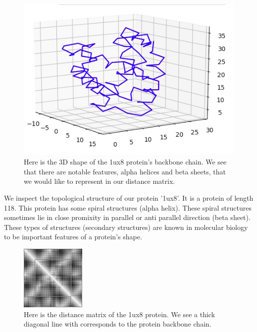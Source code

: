 \documentclass[12pt, a4paper, twocolumn, fullpage]{article}
\theoremstyle{plain}
\theoremstyle{definition}
\theoremstyle{remark}
\begin{document}
\begin{figure}[H]
	\centering
    \includegraphics[width=\linewidth]{1ux8pdb.png}
    \caption{Here is the 3D shape of the  1ux8 protein's backbone chain. We see that there are notable features, alpha helices and beta sheets, that we would like to represent in our distance matrix.}
    \label{1ux8pdb}
\end{figure}

We inspect the topological structure of our protein '1ux8'. It is a protein of length 118. This protein has some spiral structures (alpha helix). These spiral structures sometimes lie in close promixity in parallel or anti parallel direction (beta sheet). These types of structures (secondary structures) are known in molecular biology to be important features of a protein's shape.

\begin{figure}[H]
    \centering
    \includegraphics[width=\linewidth]{1ux8matBase}
    \caption{Here is the distance matrix of the 1ux8 protein. We see a thick diagonal line with corresponds to the protein backbone chain.}
    \label{1ux8matBase}
\end{figure}
    
\end{document}
